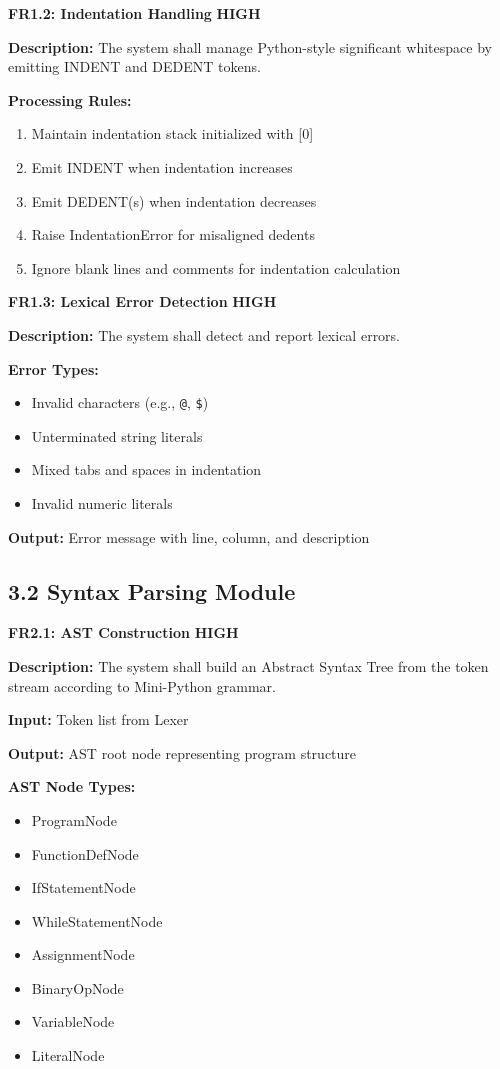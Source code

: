 \documentclass[a4paper,11pt]{article}
\newcommand{\priority}[1]{\colorbox{red!20}{\textbf{#1}}}
\begin{document}
\vspace{3mm}
\textbf{FR1.2: Indentation Handling} \priority{HIGH}

\textbf{Description:} The system shall manage Python-style significant whitespace by emitting INDENT and DEDENT tokens.

\textbf{Processing Rules:}
\begin{enumerate}
    \item Maintain indentation stack initialized with [0]
    \item Emit INDENT when indentation increases
    \item Emit DEDENT(s) when indentation decreases
    \item Raise IndentationError for misaligned dedents
    \item Ignore blank lines and comments for indentation calculation
\end{enumerate}

\vspace{3mm}
\textbf{FR1.3: Lexical Error Detection} \priority{HIGH}

\textbf{Description:} The system shall detect and report lexical errors.

\textbf{Error Types:}
\begin{itemize}
    \item Invalid characters (e.g., \texttt{@}, \texttt{\$})
    \item Unterminated string literals
    \item Mixed tabs and spaces in indentation
    \item Invalid numeric literals
\end{itemize}

\textbf{Output:} Error message with line, column, and description

\subsection{3.2 Syntax Parsing Module}

\textbf{FR2.1: AST Construction} \priority{HIGH}

\textbf{Description:} The system shall build an Abstract Syntax Tree from the token stream according to Mini-Python grammar.

\textbf{Input:} Token list from Lexer

\textbf{Output:} AST root node representing program structure

\textbf{AST Node Types:}
\begin{itemize}
    \item ProgramNode
    \item FunctionDefNode
    \item IfStatementNode
    \item WhileStatementNode
    \item AssignmentNode
    \item BinaryOpNode
    \item VariableNode
    \item LiteralNode
\end{itemize}
\end{document}
